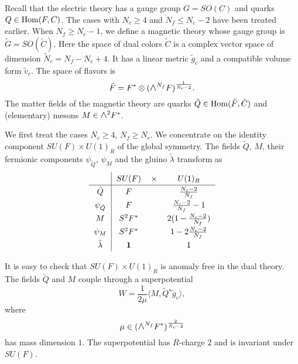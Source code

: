 \documentclass[lecture]{qft-l}
\newcommand{\lam}{\lambda}
\newcommand{\medwedge}{\mbox{\fontsize{12pt}{0pt}\selectfont $\wedge$}}
\newcommand{\Hom}{{\rm Hom}}
\newcommand{\bra}{\langle}
\newcommand{\ket}{\rangle}
\newcommand{\inv}[1]{\frac{1}{#1}}
\newcommand{\one}{{\mathbf 1}}
\newcommand{\tC}{\tilde{C}{}}
\newcommand{\tF}{\tilde{F}{}}
\newcommand{\tQ}{\tilde{Q}{}}
\newcommand{\tN}{\tilde{N}_c}
\begin{document}

Recall that the electric theory has a gauge group $G=SO(C)$
and quarks $Q\in\Hom(F,C)$.
The cases with $N_c\ge4$ and $N_f\le N_c-2$ have been treated earlier.
When $N_f\ge N_c-1$, we define a magnetic theory whose gauge group
is $\tilde{G}=SO(\tC)$.
Here the space of dual colors $\tC$ is a complex vector space of
dimension $\tN=N_f-N_c+4$.
It has a linear metric $\tilde{g}_c$ and a compatible volume form
$\tilde{v}_c$.
The space of flavors is
	\begin{equation}
\tF=F^*\otimes(\medwedge^{N_f}F)^\inv{\tN-2}.
	\end{equation}
The matter fields of the magnetic theory are quarks $\tQ\in\Hom(\tF,\tC)$
and (elementary) mesons $M\in\medwedge^2F^*$.

We first treat the cases $N_c\ge4$, $N_f\ge N_c$.
We concentrate on the identity component $SU(F)\times U(1)_R$ of the global
symmetry.
The fields $\tQ$, $M$, their fermionic components $\psi_{\tQ}$, $\psi_M$
and the gluino $\tilde{\lam}$ transform as
	\begin{equation}\label{so-transD}
	\renewcommand{\arraystretch}{1.3}
	\begin{tabular}{c|ccc}
& $SU(F)$	&$\times$   &	$U(1)_R$		\\
\hline
$\tQ$	& $F$	&	&   $\frac{N_c-2}{N_f}$		\\
$\psi_{\tQ}$  & $F$	&	&   $\frac{N_c-2}{N_f}-1$	\\
$M$	& $S^2F^*$	&	&   $2(1-\frac{N_c-2}{N_f})$	\\
$\psi_M$& $S^2F^*$	&	&   $1-2\frac{N_c-2}{N_f}$	\\
$\tilde{\lam}$	& $\one$	&	&   $1$
	\end{tabular}
	\end{equation}

\medskip\noindent
It is easy to check that $SU(F)\times U(1)_R$ is anomaly free 
in the dual theory.
The fields $\tQ$ and $M$ couple through a superpotential
	\begin{equation}\label{so-WD}
W=\inv{2\mu}\bra M,\tQ^*\tilde{g}_c\ket,
	\end{equation}
where
	\begin{equation}\label{so-mu}
\mu\in(\medwedge^{N_f}F^*)^{\frac{2}{\tN-2}}
	\end{equation}
has mass dimension $1$.
The superpotential has $R$-charge $2$ and is invariant under $SU(F)$.
\end{document}
